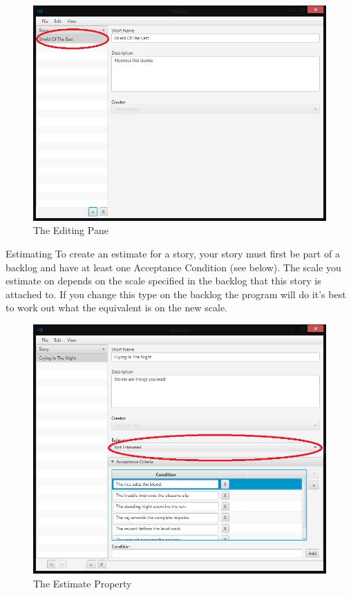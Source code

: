 \begin{figure}[H]
\centering
\includegraphics[width=\textwidth]{images/screenshots/stories4.PNG}
\caption{The Editing Pane}
\label{fig:new_project}
\end{figure}

Estimating\newline
To create an estimate for a story, your story must first be part of a backlog and have at least one Acceptance Condition (see below). The scale you estimate on depends on the scale specified in the backlog that this story is attached to. If you change this type on the backlog the program will do it's best to work out what the equivalent is on the new scale.

\begin{figure}[H]
\centering
\includegraphics[width=\textwidth]{images/screenshots/Estimate1.PNG}
\caption{The Estimate Property}
\label{fig:new_project}
\end{figure}

